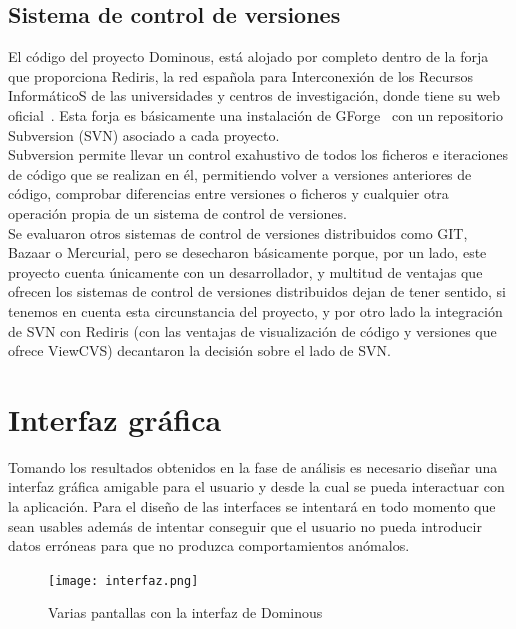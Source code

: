 \subsection{Sistema de control de versiones}

El código del proyecto Dominous, está alojado por completo dentro de
la forja que proporciona Rediris, la red española para Interconexión
de los Recursos InformáticoS de las universidades y centros de
investigación, donde tiene su web
oficial~\cite{website:dominous}. Esta forja es básicamente una
instalación de GForge~\cite{website:gforge} con un repositorio
Subversion (SVN) asociado a cada proyecto. \\

Subversion permite llevar un control exahustivo de todos los ficheros e iteraciones de código que se realizan en él,
permitiendo volver a versiones anteriores de código, comprobar diferencias entre versiones o ficheros y cualquier otra
operación propia de un sistema de control de versiones. \\

Se evaluaron otros sistemas de control de versiones distribuidos como GIT, Bazaar o Mercurial, pero se desecharon
básicamente porque, por un lado, este proyecto cuenta únicamente con un desarrollador, y multitud de ventajas que
ofrecen los sistemas de control de versiones distribuidos dejan de tener sentido, si tenemos en cuenta esta circunstancia
del proyecto, y por otro lado la integración de SVN con Rediris (con las ventajas de visualización de código y versiones
que ofrece ViewCVS) decantaron la decisión sobre el lado de SVN.

\section{Interfaz gráfica}

Tomando los resultados obtenidos en la fase de análisis es necesario diseñar una interfaz gráfica amigable
para el usuario y desde la cual se pueda interactuar con la aplicación. Para el diseño de las interfaces
se intentará en todo momento que sean usables además de intentar conseguir que el usuario no pueda
introducir datos erróneas para que no produzca comportamientos anómalos. \\

\begin{figure}[h]
  \label{fig:pantallas_interfaz}
  \begin{center}
    \texttt{[image: interfaz.png]}
  \end{center}
  \caption{Varias pantallas con la interfaz de Dominous}
\end{figure}

